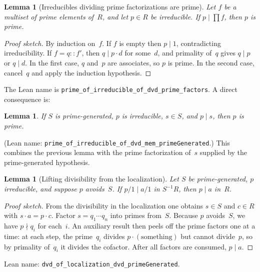 \documentclass[11pt]{article}
\theoremstyle{plain}
\newtheorem{lemma}[theorem]{Lemma}
\theoremstyle{definition}
\theoremstyle{remark}
\newcommand{\li}[1]{\texorpdfstring{\texttt{#1}}{#1}}
\begin{document}
\begin{lemma}[Irreducibles dividing prime factorizations are prime]%
\label{lem:irred-dvd-primes}
Let $f$ be a multiset of prime elements of~$R$, and let $p\in R$ be
irreducible.  If $p\mid\prod f$, then $p$ is prime.
\end{lemma}

\begin{proof}[Proof sketch]
By induction on~$f$.  If $f$ is empty then $p\mid 1$, contradicting
irreducibility.  If $f=q\mathbin{::}f'$, then $q\mid p\cdot d$ for some~$d$,
and primality of~$q$ gives $q\mid p$ or $q\mid d$.  In the first case, $q$
and~$p$ are associates, so $p$ is prime.  In the second case, cancel~$q$ and
apply the induction hypothesis.
\end{proof}

\noindent
The Lean name is
\li{prime\_of\_irreducible\_of\_dvd\_prime\_factors}.  A direct consequence is:

\begin{lemma}\label{lem:irred-dvd-mem}
If $S$ is prime-generated, $p$ is irreducible, $s\in S$, and $p\mid s$, then
$p$ is prime.
\end{lemma}

\noindent
(Lean name:
\li{prime\_of\_irreducible\_of\_dvd\_mem\_primeGenerated}.)
This combines the previous lemma with the prime factorization of~$s$ supplied
by the prime-generated hypothesis.

\medskip

\begin{lemma}[Lifting divisibility from the localization]%
\label{lem:lift-dvd}
Let $S$ be prime-generated, $p$ irreducible, and suppose $p$ avoids~$S$.  If
$p/1\mid a/1$ in $S^{-1}R$, then $p\mid a$ in~$R$.
\end{lemma}

\begin{proof}[Proof sketch]
From the divisibility in the localization one obtains $s\in S$ and $c\in R$
with $s\cdot a = p\cdot c$.  Factor $s=q_1\cdots q_n$ into primes from~$S$.
Because $p$ avoids~$S$, we have $p\nmid q_i$ for each~$i$.  An auxiliary
result then peels off the prime factors one at a time: at each step, the
prime~$q_i$ divides $p\cdot(\text{something})$ but cannot divide~$p$, so by
primality of~$q_i$ it divides the cofactor.  After all factors are consumed,
$p\mid a$.
\end{proof}

\noindent
Lean name: \li{dvd\_of\_localization\_dvd\_primeGenerated}.
\end{document}
